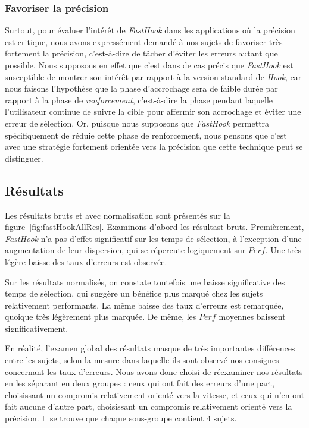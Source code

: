 	\subsubsection{Favoriser la précision}
	Surtout, pour évaluer l'intérêt de \emph{FastHook} dans les applications où la précision est critique, nous avons expressément demandé à nos sujets de favoriser très fortement la précision, c'est-à-dire de tâcher d'éviter les erreurs autant que possible. Nous supposons en effet que c'est dans de cas précis que \emph{FastHook} est susceptible de montrer son intérêt par rapport à la version standard de \emph{Hook}, car nous faisons l'hypothèse que la phase d'accrochage sera de faible durée par rapport à la phase de \emph{renforcement}, c'est-à-dire la phase pendant laquelle l'utilisateur continue de suivre la cible pour affermir son accrochage et éviter une erreur de sélection. Or, puisque nous supposons que \emph{FastHook} permettra spécifiquement de réduie cette phase de renforcement, nous pensons que c'est avec une stratégie fortement orientée vers la précision que cette technique peut se distinguer.

	
	\subsection{Résultats}
	Les résultats bruts et avec normalisation sont présentés sur la figure~\ref{fig:fastHookAllRes}. Examinons d'abord les résultast bruts. Premièrement, \emph{FastHook} n'a pas d'effet significatif sur les temps de sélection, à l'exception d'une augmentation de leur dispersion, qui se répercute logiquement sur $Perf$. Une très légère baisse des taux d'erreurs est observée.
	
	Sur les résultats normalisés, on constate toutefois une baisse significative des temps de sélection, qui suggère un bénéfice plus marqué chez les sujets relativement performants. La même baisse des taux d'erreurs est remarquée, quoique très légèrement plus marquée. De même, les $Perf$ moyennes baissent significativement.
	
	En réalité, l'examen global des résultats masque de très importantes différences entre les sujets, selon la mesure dans laquelle ils sont observé nos consignes concernant les taux d'erreurs. Nous avons donc choisi de réexaminer nos résultats en les séparant en deux groupes : ceux qui ont fait des erreurs d'une part, choisissant un compromis relativement orienté vers la vitesse, et ceux qui n'en ont fait aucune d'autre part, choisissant un compromis relativement orienté vers la précision. Il se trouve que chaque sous-groupe contient 4 sujets.
	

